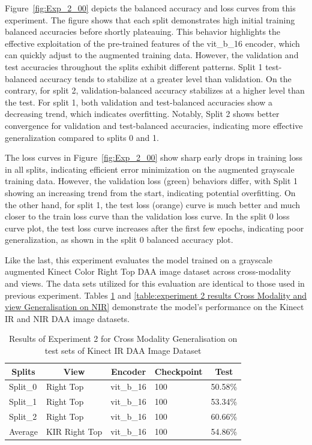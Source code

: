 Figure~\ref{fig:Exp_2_00} depicts the balanced accuracy and loss curves from this experiment. The figure shows that each split demonstrates high initial training balanced accuracies before shortly plateauing. This behavior highlights the effective exploitation of the pre-trained features of the vit\_b\_16 encoder, which can quickly adjust to the augmented training data. However, the validation and test accuracies throughout the splits exhibit different patterns. Split 1 test-balanced accuracy tends to stabilize at a greater level than validation.
On the contrary, for split 2, validation-balanced accuracy stabilizes at a higher level than the test. For split 1, both validation and test-balanced accuracies show a decreasing trend, which indicates overfitting. Notably, Split 2 shows better convergence for validation and test-balanced accuracies, indicating more effective generalization compared to splits 0 and 1.

The loss curves in Figure~\ref{fig:Exp_2_00} show sharp early drops in training loss in all splits, indicating efficient error minimization on the augmented grayscale training data. However, the validation loss (green) behaviors differ, with Split 1 showing an increasing trend from the start, indicating potential overfitting. On the other hand, for split 1, the test loss (orange) curve is much better and much closer to the train loss curve than the validation loss curve. In the split 0 loss curve plot, the test loss curve increases after the first few epochs, indicating poor generalization, as shown in the split 0 balanced accuracy plot. 


Like the last, this experiment evaluates the model trained on a grayscale augmented Kinect Color Right Top DAA image dataset across cross-modality and views. The data sets utilized for this evaluation are identical to those used in previous experiment. Tables \ref{table:experiment 2 results Cross Modality Generalisation} and \ref{table:experiment 2 results Cross Modality and view Generalisation on NIR} demonstrate the model's performance on the Kinect IR and NIR DAA image datasets. 
\begin{table}[htbp]
\caption{Results of Experiment 2 for Cross Modality Generalisation on test sets of Kinect IR DAA Image Dataset}
\label{table:experiment 2 results Cross Modality Generalisation}
\centering
\begin{tabular}{lllll}
\multicolumn{1}{c}{\textbf{Splits}} & \multicolumn{1}{c}{\textbf{View}} & \multicolumn{1}{c}{\textbf{Encoder}} & \multicolumn{1}{c}{\textbf{Checkpoint}} & \multicolumn{1}{c}{\textbf{Test}}\\
\hline
Split\_0 & Right Top & vit\_b\_16 & 100 & 50.58\% \\
Split\_1 & Right Top & vit\_b\_16 & 100 & 53.34\% \\
Split\_2 & Right Top & vit\_b\_16 & 100 & 60.66\% \\
\hline
Average & KIR Right Top & vit\_b\_16 & 100 & 54.86\% \\
\hline
\end{tabular}
\end{table}

